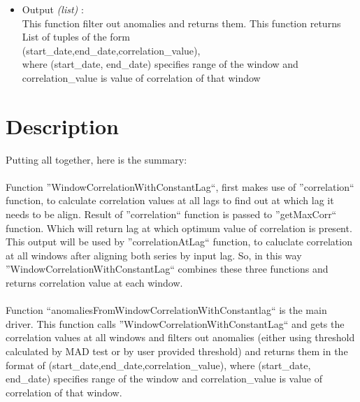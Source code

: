 \begin{itemize}
 \item Output \textit{(list)} : \\
  This function filter out anomalies and returns them. This function returns
  List of tuples of the form \\ (start\_date,end\_date,correlation\_value), \\
  where (start\_date, end\_date) specifies range of the window and 
correlation\_value is value of correlation of that window
  
\end{itemize}

\section{Description}


Putting all together, here is the summary:\\
\\
Function ''WindowCorrelationWithConstantLag``, first makes use of 
''correlation`` function, to calculate correlation values at all lags to find 
out at which lag it needs to be align. Result of ''correlation`` function is 
passed to ''getMaxCorr`` function. Which will return lag at which optimum value 
of correlation is present. This output will be used by ''correlationAtLag`` 
function, to caluclate correlation at all windows after aligning both series by 
input lag. So, in this way ''WindowCorrelationWithConstantLag`` combines these 
three functions and returns correlation value at each window.
\\
\\
Function ``anomaliesFromWindowCorrelationWithConstantlag`` is the main driver. 
This function calls ''WindowCorrelationWithConstantLag`` and gets the 
correlation values at all windows and filters out anomalies (either using 
threshold calculated by MAD test or by user provided threshold) and returns them 
in the format of (start\_date,end\_date,correlation\_value),
  where (start\_date, end\_date) specifies range of the window and 
correlation\_value is value of correlation of that window.